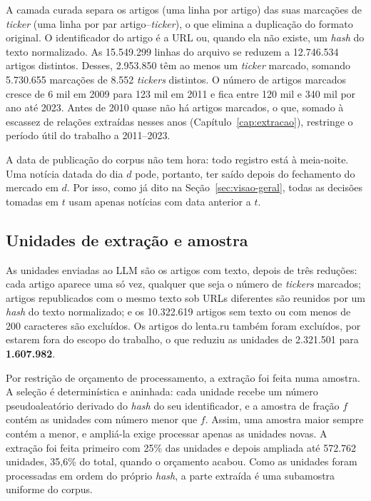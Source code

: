 A camada curada separa os artigos (uma linha por artigo) das suas marcações de \emph{ticker} (uma linha
por par artigo--\emph{ticker}), o que elimina a duplicação do formato original. O identificador do artigo
é a URL ou, quando ela não existe, um \emph{hash} do texto normalizado. As 15.549.299 linhas do arquivo se
reduzem a 12.746.534 artigos distintos. Desses, 2.953.850 têm ao menos um \emph{ticker} marcado, somando
5.730.655 marcações de 8.552 \emph{tickers} distintos. O número de artigos marcados cresce de 6 mil em
2009 para 123 mil em 2011 e fica entre 120 mil e 340 mil por ano até 2023. Antes de 2010 quase não há
artigos marcados, o que, somado à escassez de relações extraídas nesses anos
(Capítulo~\ref{cap:extracao}), restringe o período útil do trabalho a 2011--2023.

A data de publicação do corpus não tem hora: todo registro está à meia-noite. Uma notícia datada do
dia $d$ pode, portanto, ter saído depois do fechamento do mercado em $d$. Por isso, como já dito na
Seção~\ref{sec:visao-geral}, todas as decisões tomadas em $t$ usam apenas notícias com data anterior
a $t$.

\subsection{Unidades de extração e amostra}

As unidades enviadas ao LLM são os artigos com texto, depois de três reduções: cada artigo aparece uma
só vez, qualquer que seja o número de \emph{tickers} marcados; artigos republicados com o mesmo texto
sob URLs diferentes são reunidos por um \emph{hash} do texto normalizado; e os 10.322.619 artigos sem
texto ou com menos de 200 caracteres são excluídos. Os artigos do lenta.ru também foram excluídos, por estarem fora do
escopo do trabalho, o que reduziu as unidades de 2.321.501 para \textbf{1.607.982}.

Por restrição de orçamento de processamento, a extração foi feita numa amostra. A seleção é
determinística e aninhada: cada unidade recebe um número pseudoaleatório derivado do \emph{hash} do seu
identificador, e a amostra de fração $f$ contém as unidades com número menor que $f$. Assim, uma amostra
maior sempre contém a menor, e ampliá-la exige processar apenas as unidades novas. A extração foi
feita primeiro com 25\% das unidades e depois ampliada até 572.762 unidades, 35,6\% do total, quando o
orçamento acabou. Como as unidades foram processadas em ordem do próprio \emph{hash}, a parte extraída é
uma subamostra uniforme do corpus.

